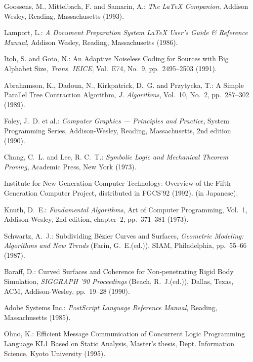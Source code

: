 
\begin{thebibliography}{10}

Goossens, M., Mittelbach, F. and Samarin, A.: {\em The LaTeX Companion\/},
  Addison Wesley, Reading, Massachusetts (1993).

Lamport, L.: {\em A Document Preparation System {\LaTeX} User's Guide \&
  Reference Manual\/}, Addison Wesley, Reading, Massachusetts (1986).

Itoh, S. and Goto, N.: An Adaptive Noiseless Coding for Sources with Big
  Alphabet Size, {\em Trans. IEICE\/},  Vol.~E74, No.~9, pp.\ 2495--2503
  (1991).

Abrahamson, K., Dadoun, N., Kirkpatrick, D.~G. and Przytycka, T.: A Simple
  Parallel Tree Contraction Algorithm, {\em J. Algorithms\/},  Vol.~10, No.~2,
  pp.\ 287--302 (1989).

Foley, J.~D. et al.: {\em Computer Graphics --- Principles and Practice\/},
  System Programming Series, Addison-Wesley, Reading, Massachusetts, 2nd
  edition (1990).

Chang, C.~L. and Lee, R. C.~T.: {\em Symbolic Logic and Mechanical Theorem
  Proving\/}, Academic Press, New York (1973).

{Institute for New Generation Computer Technology}: Overview of the Fifth
  Generation Computer Project, distributed in {FGCS'92} (1992).
\newblock (in Japanese).

Knuth, D.~E.: {\em Fundamental Algorithms\/}, Art of Computer Programming,
  Vol.~1, Addison-Wesley, 2nd edition, chapter~2, pp.\ 371--381 (1973).

Schwartz, A.~J.: Subdividing B{\'e}zier Curves and Surfaces, {\em Geometric
  Modeling: Algorithms and New Trends\/} (Farin, G.~E.(ed.)), SIAM,
  Philadelphia, pp.\ 55--66 (1987).

Baraff, D.: Curved Surfaces and Coherence for Non-penetrating Rigid Body
  Simulation, {\em SIGGRAPH '90 Proceedings\/} (Beach, R.~J.(ed.)), Dallas,
  Texas, ACM, Addison-Wesley, pp.\ 19--28 (1990).

Adobe Systems Inc.: {\em PostScript Language Reference Manual\/}, Reading,
  Massachusetts (1985).

Ohno, K.: Efficient Message Communication of Concurrent Logic Programming
  Language KL1 Based on Static Analysis, Master's thesis, Dept. Information
  Science, Kyoto University (1995).


\end{thebibliography}
